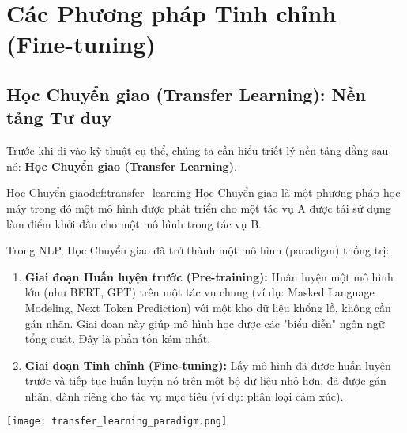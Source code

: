 
\section{Các Phương pháp Tinh chỉnh (Fine-tuning)}
\label{sec:finetuning_methods}

\subsection{Học Chuyển giao (Transfer Learning): Nền tảng Tư duy}
\label{ssec:transfer_learning}
Trước khi đi vào kỹ thuật cụ thể, chúng ta cần hiểu triết lý nền tảng đằng sau nó: \textbf{Học Chuyển giao (Transfer Learning)}.

\begin{definition}{Học Chuyển giao}{def:transfer_learning}
    Học Chuyển giao là một phương pháp học máy trong đó một mô hình được phát triển cho một tác vụ A được tái sử dụng làm điểm khởi đầu cho một mô hình trong tác vụ B.
\end{definition}

Trong NLP, Học Chuyển giao đã trở thành một mô hình (paradigm) thống trị:
\begin{enumerate}
    \item \textbf{Giai đoạn Huấn luyện trước (Pre-training):} Huấn luyện một mô hình lớn (như BERT, GPT) trên một tác vụ chung (ví dụ: Masked Language Modeling, Next Token Prediction) với một kho dữ liệu khổng lồ, không cần gán nhãn. Giai đoạn này giúp mô hình học được các "biểu diễn" ngôn ngữ tổng quát. Đây là phần tốn kém nhất.
    \item \textbf{Giai đoạn Tinh chỉnh (Fine-tuning):} Lấy mô hình đã được huấn luyện trước và tiếp tục huấn luyện nó trên một bộ dữ liệu nhỏ hơn, đã được gán nhãn, dành riêng cho tác vụ mục tiêu (ví dụ: phân loại cảm xúc).
\end{enumerate}

\begin{center}
    \texttt{[image: transfer\_learning\_paradigm.png]}
    \label{fig:transfer_learning_paradigm}
\end{center}

